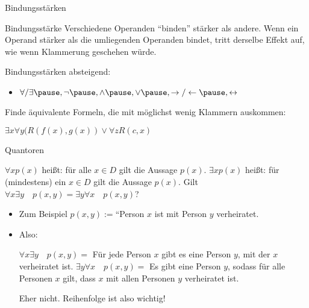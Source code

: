\begin{frame}{Bindungsstärken}
	\begin{block}{Bindungsstärke}
		Verschiedene Operanden ``binden'' stärker als andere. \ip Wenn ein Operand stärker als die umliegenden Operanden bindet, tritt derselbe Effekt auf, wie wenn Klammerung geschehen würde.
	\end{block}

	\bp
	
	Bindungsstärken absteigend:
	\begin{itemize}
		\ip \item $\forall / \exists\ip,\lnot\ip,\land\ip,\lor\ip,\rightarrow/\leftarrow\ip,\leftrightarrow$
	\end{itemize}

	\bp
	
	Finde äquivalente Formeln, die mit möglichst wenig Klammern auskommen:
	\begin{itemize}
		\pitem $\exists x \forall y (R(f(x), g(x)) \lor \forall z R(c, x)$ %
	\end{itemize}

\end{frame}

\begin{frame}{Quantoren}
\begin{itemize}
	\pitem $\forall x p(x)$ heißt\ip: für alle $x \in D$ gilt die Aussage $p(x)$.
	\pitem $\exists x p(x)$ heißt\ip: für (mindestens) ein $x \in D$ gilt die Aussage $p(x)$.
	\pitem Gilt $\forall x \exists y \quad p(x,y) = \exists y \forall x \quad p(x,y)$?
	\begin{itemize}
		\pause\item Zum Beispiel $p(x,y) := $``Person $x$ ist mit Person $y$ verheiratet.
		\pause\item Also:
		\begin{itemize}
			\pitem $\forall x \exists y \quad p(x,y) = $ Für jede Person $x$ gibt es eine Person $y$, mit der $x$ verheiratet ist.
			\pitem $\exists y \forall x \quad p(x,y) = $ Es gibt eine Person $y$, sodass für alle Personen $x$ gilt, dass $x$ mit allen Personen $y$ verheiratet ist.
		\end{itemize}
		\pitem Eher nicht. \ip Reihenfolge ist also wichtig!
	\end{itemize}
\end{itemize}
\end{frame}

